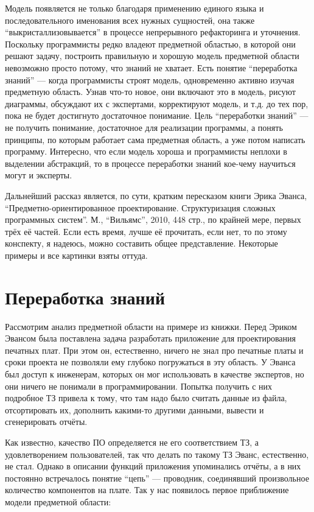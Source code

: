 \documentclass{../../text-style}
\begin{document}
Модель появляется не только благодаря применению единого языка и последовательного именования всех нужных сущностей, она также ``выкристаллизовывается'' в процессе непрерывного рефакторинга и уточнения. Поскольку программисты редко владеют предметной областью, в которой они решают задачу, построить правильную и хорошую модель предметной области невозможно просто потому, что знаний не хватает. Есть понятие ``переработка знаний'' --- когда программисты строят модель, одновременно активно изучая предметную область. Узнав что-то новое, они включают это в модель, рисуют диаграммы, обсуждают их с экспертами, корректируют модель, и т.д. до тех пор, пока не будет достигнуто достаточное понимание. Цель ``переработки знаний'' --- не получить понимание, достаточное для реализации программы, а понять принципы, по которым работает сама предметная область, а уже потом написать программу. Интересно, что если модель хороша и программисты неплохи в выделении абстракций, то в процессе переработки знаний кое-чему научиться могут и эксперты.

Дальнейший рассказ является, по сути, кратким пересказом книги Эрика Эванса, ``Предметно-ориентированное проектирование. Структуризация сложных программных систем''. М., ``Вильямс'', 2010, 448 стр., по крайней мере, первых трёх её частей. Если есть время, лучше её прочитать, если нет, то по этому конспекту, я надеюсь, можно составить общее представление. Некоторые примеры и все картинки взяты оттуда.

\section{Переработка знаний}

Рассмотрим анализ предметной области на примере из книжки. Перед Эриком Эвансом была поставлена задача разработать приложение для проектирования печатных плат. При этом он, естественно, ничего не знал про печатные платы и сроки проекта не позволяли ему глубоко погружаться в эту область. У Эванса был доступ к инженерам, которых он мог использовать в качестве экспертов, но они ничего не понимали в программировании. Попытка получить с них подробное ТЗ привела к тому, что там надо было считать данные из файла, отсортировать их, дополнить какими-то другими данными, вывести и сгенерировать отчёты.

Как известно, качество ПО определяется не его соответствием ТЗ, а удовлетворением пользователей, так что делать по такому ТЗ Эванс, естественно, не стал. Однако в описании функций приложения упоминались отчёты, а в них постоянно встречалось понятие ``цепь'' --- проводник, соединявший произвольное количество компонентов на плате. Так у нас появилось первое приближение модели предметной области:
\end{document}
